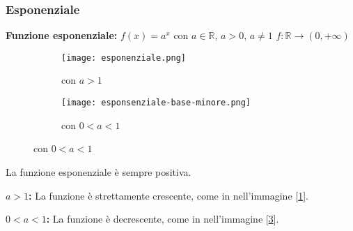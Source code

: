 \subsubsection{Esponenziale}
\textbf{Funzione esponenziale:} $f(x) = a^x$ con $a \in \mathbb{R}$, \: \: $a > 0$, \: \: $a \neq 1$ \: \: $f: \mathbb{R} \longrightarrow (0, +\infty)$
\begin{figure}[h!]
    \begin{subfigure}{.5\textwidth}
        \centering
        \texttt{[image: esponenziale.png]}
        \caption{con $a > 1$}
        \label{fig:esponenziale}
    \end{subfigure}
    \begin{subfigure}{.5\textwidth}
        \centering
        \texttt{[image: esponsenziale-base-minore.png]}
        \caption{con $0 < a < 1$}
        \label{fig:esponsenziale-base-minore}
    \end{subfigure}
\end{figure}
\begin{note}
    La funzione esponenziale è sempre positiva.
\end{note}
\begin{observation}
    \textbf{$a > 1$:} La funzione è strettamente crescente, come in nell'immagine [\ref{fig:esponenziale}].
\end{observation}
\begin{observation}
    \textbf{$0 < a < 1$:} La funzione è decrescente, come in nell'immagine [\ref{fig:esponsenziale-base-minore}].
\end{observation}

